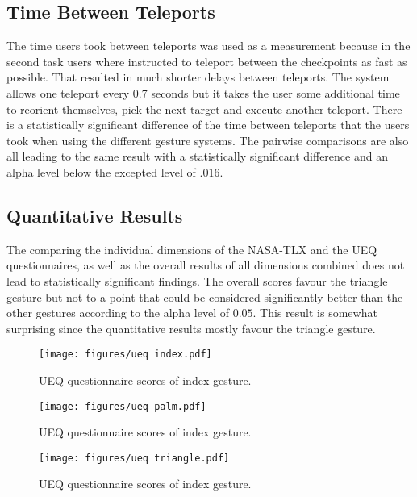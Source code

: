\subsection{Time Between Teleports}
The time users took between teleports was used as a measurement because in the second task users where instructed to teleport between the checkpoints as fast as possible. That resulted in much shorter delays between teleports. The system allows one teleport every 0.7 seconds but it takes the user some additional time to reorient themselves, pick the next target and execute another teleport. There is a statistically significant difference of the time between teleports that the users took when using the different gesture systems. The pairwise comparisons are also all leading to the same result with a statistically significant difference and an alpha level below the excepted level of $.016$. 



\subsection{Quantitative Results}
The comparing the individual dimensions of the NASA-TLX and the UEQ questionnaires, as well as the overall results of all dimensions combined does not lead to statistically significant findings. The overall scores favour the triangle gesture but not to a point that could be considered significantly better than the other gestures according to the alpha level of $0.05$. This result is somewhat surprising since the quantitative results mostly favour the triangle gesture. 

\begin{figure}[!ht]
    \centering
    \texttt{[image: figures/ueq index.pdf]}
    \caption{UEQ questionnaire scores of index gesture.}
    \label{fig:ueqIndex}
\end{figure}
\begin{figure}[!ht]
    \centering
    \texttt{[image: figures/ueq palm.pdf]}
    \caption{UEQ questionnaire scores of index gesture.}
    \label{fig:ueqPalm}
\end{figure}
\begin{figure}[!ht]
    \centering
    \texttt{[image: figures/ueq triangle.pdf]}
    \caption{UEQ questionnaire scores of index gesture.}
    \label{fig:ueqTriangle}
\end{figure}

